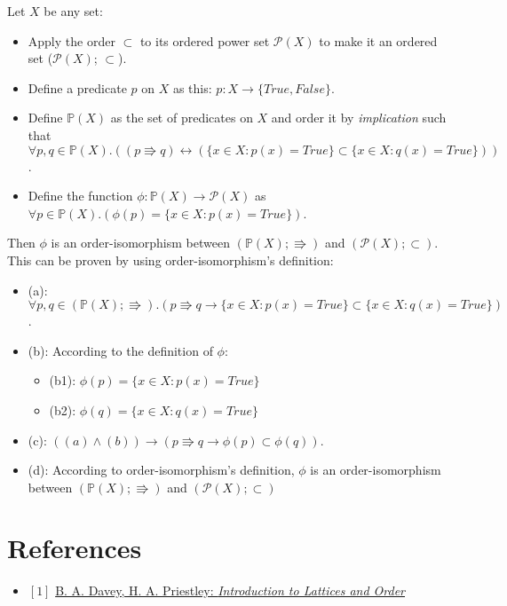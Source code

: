 \documentclass[12pt, letterpaper, oneside]{book}
\begin{document}
Let $X$ be any set:
\begin{itemize}
  \item Apply the order $\subset$ to its ordered power set $\mathcal{P}(X)$ to make it an ordered set ($\mathcal{P}(X)$;
        $\subset$).
  \item Define a predicate $p$ on $X$ as this: $p: X \rightarrow \{True, False\}$.
  \item Define $\mathbb{P}(X)$ as the set of predicates on $X$ and order it by \textit{implication} such that
        $\forall p, q \in \mathbb{P}(X). ((p \Rrightarrow q) \leftrightarrow (\{x \in X: p(x) = True\} \subset
          \{x \in X: q(x) = True\}))$.
  \item Define the function $\phi: \mathbb{P}(X) \rightarrow \mathcal{P}(X)$ as $\forall p \in \mathbb{P}(X). (\phi(p)
          = \{x \in X: p(x) = True\})$.
\end{itemize}

Then $\phi$ is an order-isomorphism between $(\mathbb{P}(X); \Rrightarrow)$ and $(\mathcal{P}(X); \subset)$. This can
be proven by using order-isomorphism's definition:
\begin{itemize}
  \item (a): $\forall p, q \in (\mathbb{P}(X); \Rrightarrow). (p \Rrightarrow q \rightarrow \{x \in X: p(x) = True\}
          \subset \{x \in X: q(x) = True\})$.
  \item (b): According to the definition of $\phi$:
        \begin{itemize}
          \item (b1): $\phi(p) = \{x \in X: p(x) = True\}$
          \item (b2): $\phi(q) = \{x \in X: q(x) = True\}$
        \end{itemize}
  \item (c): $((a) \land (b)) \rightarrow (p \Rrightarrow q \rightarrow \phi(p) \subset \phi(q))$.
  \item (d): According to order-isomorphism's definition, $\phi$ is an order-isomorphism between $(\mathbb{P}(X);
          \Rrightarrow)$ and $(\mathcal{P}(X); \subset)$
\end{itemize}

%
%

\chapter*{References}

\begin{itemize}
  \item $[1]$ \href{https://www.cambridge.org/core/books/introduction-to-lattices-and-order/946458CB6638AF86D85BA00F5787F4F4}{B. A. Davey, H. A. Priestley: \it{Introduction to Lattices and Order}}
\end{itemize}
\end{document}
